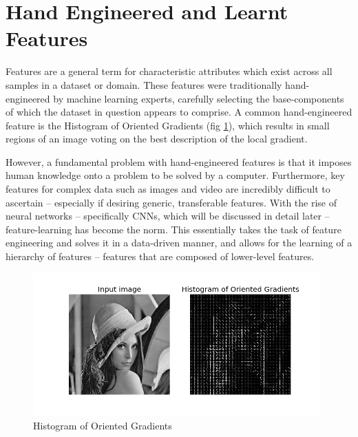 \documentclass{report}
\begin{document}
\section{Hand Engineered and Learnt Features} \label{hand-eng:1}
Features are a general term for characteristic attributes which exist across all samples in a dataset or domain. These features were traditionally hand-engineered by machine learning experts, carefully selecting the base-components of which the dataset in question appears to comprise. A common hand-engineered feature is the Histogram of Oriented Gradients (fig \ref{fig:hog:1}), which results in small regions of an image voting on the best description of the local gradient. \par
However, a fundamental problem with hand-engineered features is that it imposes human knowledge onto a problem to be solved by a computer. Furthermore, key features for complex data such as images and video are incredibly difficult to ascertain -- especially if desiring generic, transferable features. With the rise of neural networks -- specifically CNNs, which will be discussed in detail later -- feature-learning has become the norm. This essentially takes the task of feature engineering and solves it in a data-driven manner, and allows for the learning of  a hierarchy of features -- features that are composed of lower-level features. \par
\begin{figure}[!h]
 \centering
 \includegraphics[width=11cm]{hog}
 \caption{Histogram of Oriented Gradients}
 \label{fig:hog:1}
\end{figure}
\end{document}
